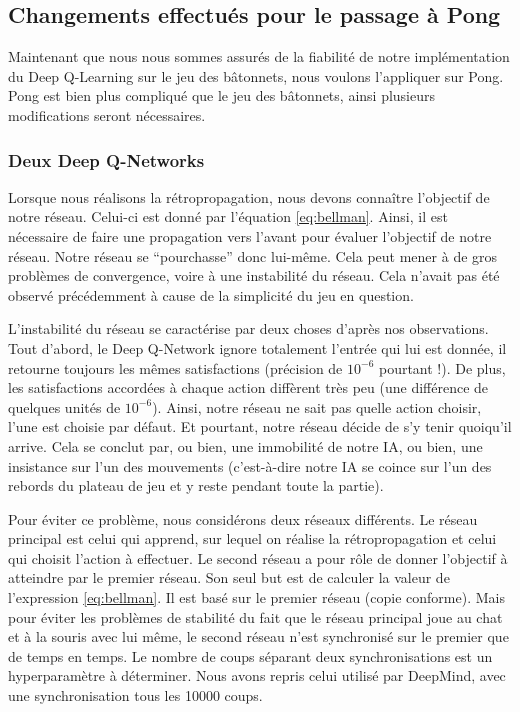 \subsection{Changements effectués pour le passage à Pong}

Maintenant que nous nous sommes assurés de la fiabilité de notre implémentation du Deep Q-Learning sur le jeu des bâtonnets, nous voulons l'appliquer sur Pong.
Pong est bien plus compliqué que le jeu des bâtonnets, ainsi plusieurs modifications seront nécessaires.

\subsubsection{Deux Deep Q-Networks}
\label{section:2networks}

Lorsque nous réalisons la rétropropagation, nous devons connaître l'objectif de notre réseau. Celui-ci est donné par l'équation \ref{eq:bellman}. Ainsi, il est
nécessaire de faire une propagation vers l'avant pour évaluer l'objectif de notre réseau. Notre réseau se ``pourchasse'' donc lui-même. Cela peut mener à de gros 
problèmes de convergence, voire à une instabilité du réseau. Cela n'avait pas été observé précédemment à cause de la simplicité du jeu en question.

L'instabilité du réseau se caractérise par deux choses d'après nos observations. Tout d'abord, le Deep Q-Network ignore totalement l'entrée qui lui est donnée,
il retourne toujours les mêmes satisfactions (précision de $10^{-6}$ pourtant !). De plus, les satisfactions accordées à chaque action diffèrent très peu
(une différence de quelques unités de $10^{-6}$). Ainsi, notre réseau ne sait pas quelle action choisir, l'une est choisie par défaut. Et pourtant, notre réseau
décide de s'y tenir quoiqu'il arrive. Cela se conclut par, ou bien, une immobilité de notre IA, ou bien, une insistance sur l'un des mouvements (c'est-à-dire notre
IA se coince sur l'un des rebords du plateau de jeu et y reste pendant toute la partie).

Pour éviter ce problème, nous considérons deux réseaux différents. Le réseau principal est celui qui apprend, sur lequel on réalise la rétropropagation et celui
qui choisit l'action à effectuer. Le second réseau a pour rôle de donner l'objectif à atteindre par le premier réseau. Son seul but est de calculer la valeur
de l'expression \ref{eq:bellman}. Il est basé sur le premier réseau (copie conforme). Mais pour éviter les problèmes de stabilité du fait que le réseau principal 
joue au chat et à la souris avec lui même, le second réseau n'est synchronisé sur le premier que de temps en temps. Le nombre de coups séparant deux 
synchronisations est un hyperparamètre à déterminer. Nous avons repris celui utilisé par DeepMind, avec une synchronisation tous les 10000 coups.

